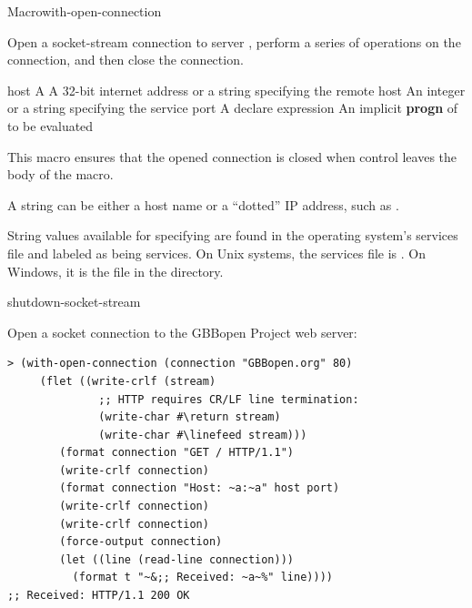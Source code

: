 \documentclass[10pt,twoside,english,pdftex]{article}
\begin{document}

\begin{functiondoc}{Macro}{with-open-connection}%
  {\code{(}\code{)}
    \superstar{}
    \superstar{}}
%
%
%

\fnsyntax

\fnpurpose Open a socket-stream connection to server ,
perform a series of operations on the connection, and then close the
connection.

\fnpackage {}

\fnmodule {}

\fnargs
\begin{args}{host}
\arg[var] A 
\arg[host] A 32-bit internet address or a string specifying the remote host
\arg[port] An integer or a string specifying the service port
\arg[declaration] A declare expression
\arg[forms] An implicit \textbf{progn} of  to be evaluated
\end{args}

\fndescription This macro ensures that the opened connection is closed when
control leaves the body of the macro.

A  string can be either a host name or a ``dotted'' IP address,
such as .

String values available for specifying  are found in the operating
system's services file and labeled as being  services. On Unix
systems, the services file is . On Windows, it is the file
 in the  directory.

\begin{alsos}{shutdown-socket-stream}
\end{alsos}

\fnexample
Open a socket connection to the GBBopen Project web server:
%
\W\supp
\begin{verbatim}
> (with-open-connection (connection "GBBopen.org" 80)
     (flet ((write-crlf (stream)
              ;; HTTP requires CR/LF line termination: 
              (write-char #\return stream)
              (write-char #\linefeed stream)))
        (format connection "GET / HTTP/1.1")
        (write-crlf connection)
        (format connection "Host: ~a:~a" host port)
        (write-crlf connection)
        (write-crlf connection)
        (force-output connection)
        (let ((line (read-line connection)))
          (format t "~&;; Received: ~a~%" line))))
;; Received: HTTP/1.1 200 OK
\end{verbatim}

\end{functiondoc}
\end{document}
